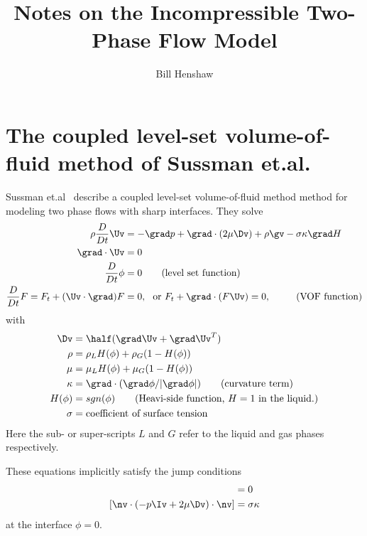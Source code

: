 \documentclass[11pt]{article}
\begin{document}
 
\title{Notes on the Incompressible Two-Phase Flow Model}

\author{
Bill Henshaw \\
}
 
\maketitle


\section{The coupled level-set volume-of-fluid method of Sussman et.al.}


Sussman et.al~\cite{Sussman2007} describe a coupled level-set volume-of-fluid method method
for modeling two phase flows with sharp interfaces.
They solve
\begin{align*}
\rho {D\over Dt} \Uv &= -\grad p + \grad\cdot( 2\mu \Dv) + \rho \gv - \sigma \kappa \grad H \\
\grad\cdot\Uv &= 0 \\
{D\over Dt} \phi &= 0 \qquad\text{(level set function)} \\
{D\over Dt} F = F_t + (\Uv\cdot\grad)F &= 0, ~~\text{or}~ F_t + \grad\cdot( F\Uv)=0, ~~ \qquad\text{(VOF function)}
\end{align*}
with 
\begin{align*}
   \Dv &= \half(\grad\Uv + \grad\Uv^T) \\
   \rho &= \rho_L H(\phi) + \rho_G(1-H(\phi)) \\
   \mu &= \mu_L H(\phi) + \mu_G(1-H(\phi)) \\
   \kappa &= \grad\cdot( \grad\phi/\vert \grad\phi \vert) \qquad\text{(curvature term)} \\
   H(\phi) &= sgn(\phi) \qquad\text{(Heavi-side function, $H=1$ in the liquid.)}  \\
   \sigma & = \text{coefficient of surface tension}
\end{align*} 
Here the sub- or super-scripts $L$ and $G$ refer to the liquid and gas phases respectively.

These equations implicitly satisfy the jump conditions 
\begin{align*}
  [ \Uv ] & = 0 \\
  [ \nv\cdot( -p \Iv + 2\mu \Dv )\cdot \nv ] & = \sigma\kappa 
\end{align*} 
at the interface $\phi=0$. 
\end{document}
